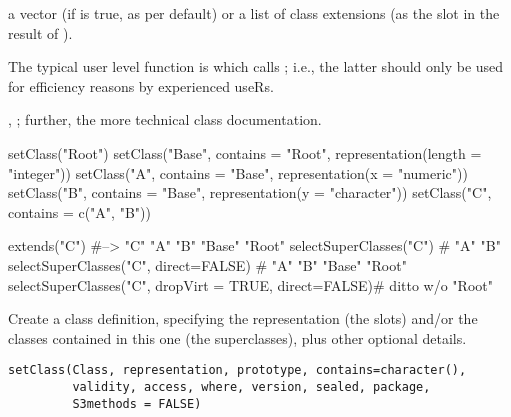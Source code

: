 %
\begin{Value}
a  vector (if  is true, as per
default) or a list of class extensions (as the  slot in
the result of ).
\end{Value}
%
\begin{Note}\relax
The typical user level function is 
which calls ; i.e., the latter should only
be used for efficiency reasons by experienced useRs.
\end{Note}
%
\begin{SeeAlso}\relax
{}, ; further, the more technical
class  documentation.
\end{SeeAlso}
%
\begin{Examples}
\begin{ExampleCode}
setClass("Root")
setClass("Base", contains = "Root", representation(length = "integer"))
setClass("A", contains = "Base", representation(x = "numeric"))
setClass("B", contains = "Base", representation(y = "character"))
setClass("C", contains = c("A", "B"))

extends("C")   #-->  "C"  "A" "B"  "Base" "Root"
selectSuperClasses("C") # "A" "B"
selectSuperClasses("C", direct=FALSE) # "A" "B"  "Base"  "Root"
selectSuperClasses("C", dropVirt = TRUE, direct=FALSE)# ditto w/o "Root"
\end{ExampleCode}
\end{Examples}
%
\begin{Description}\relax
Create  a class definition, specifying the representation (the slots) and/or the classes contained in this one (the superclasses), plus other optional details.
\end{Description}
%
\begin{Usage}
\begin{verbatim}
setClass(Class, representation, prototype, contains=character(),
         validity, access, where, version, sealed, package,
         S3methods = FALSE)
\end{verbatim}
\end{Usage}
%
